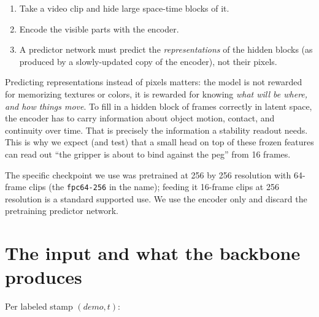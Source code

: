 \documentclass[11pt]{article}
\begin{document}
\begin{enumerate}[leftmargin=2em]
  \item Take a video clip and hide large space-time blocks of it.
  \item Encode the visible parts with the encoder.
  \item A predictor network must predict the \emph{representations} of the hidden
        blocks (as produced by a slowly-updated copy of the encoder), not their
        pixels.
\end{enumerate}

Predicting representations instead of pixels matters: the model is not rewarded for
memorizing textures or colors, it is rewarded for knowing \emph{what will be where,
and how things move}. To fill in a hidden block of frames correctly in latent space,
the encoder has to carry information about object motion, contact, and continuity
over time. That is precisely the information a stability readout needs. This is why
we expect (and test) that a small head on top of these frozen features can read out
``the gripper is about to bind against the peg'' from 16 frames.

The specific checkpoint we use was pretrained at 256 by 256 resolution with 64-frame
clips (the \texttt{fpc64-256} in the name); feeding it 16-frame clips at 256
resolution is a standard supported use. We use the encoder only and discard the
pretraining predictor network.

\section{The input and what the backbone produces}

Per labeled stamp $(demo, t)$:
\end{document}
